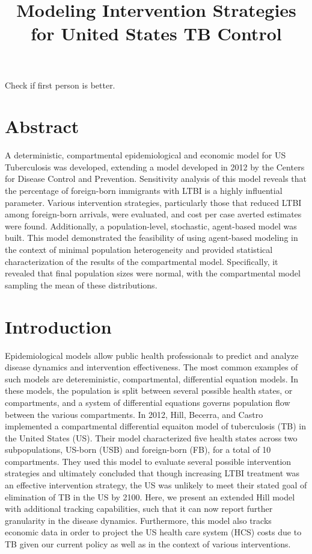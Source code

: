 \documentclass{amsart}
\title{Modeling Intervention Strategies for United States TB Control}
\begin{document}
\maketitle

{\huge \color{red} Check if first person is better.}

\section{Abstract}
A deterministic, compartmental epidemiological and economic model for US
Tuberculosis was developed, extending a model developed in 2012 by the Centers
for Disease Control and Prevention. Sensitivity analysis of this model reveals
that the percentage of foreign-born immigrants with LTBI is a highly influential
parameter. Various intervention strategies, particularly those that reduced LTBI
among foreign-born arrivals, were evaluated, and cost per case averted estimates
were found.  Additionally, a population-level, stochastic, agent-based model was
built. This model demonstrated the feasibility of using agent-based modeling in
the context of minimal population heterogeneity and provided statistical
characterization of the results of the compartmental model. Specifically, it
revealed that final population sizes were normal, with the compartmental model
sampling the mean of these distributions. 

\section{Introduction}
Epidemiological models allow public health professionals to predict and analyze
disease dynamics and intervention effectiveness. The most common examples of
such models are detereministic, compartmental, differential equation models. In
these models, the population is split between several possible health states, or
compartments, and a system of differential equations governs population flow
between the various compartments. In 2012, Hill, Becerra, and Castro implemented
a compartmental differential equaiton model of tuberculosis (TB) in the United
States (US).  Their model characterized five health states across two
subpopulations, US-born (USB) and foreign-born (FB), for a total of 10
compartments. They used this model to evaluate several possible intervention
strategies and ultimately concluded that though increasing LTBI treatment was an
effective intervention strategy, the US was unlikely to meet their stated goal
of elimination of TB in the US by 2100. Here, we present an extended Hill model
with additional tracking capabilities, such that it can now report
further granularity in the disease dynamics. Furthermore, this model also tracks
economic data in order to project the US health care system (HCS) costs due to
TB given our current policy as well as in the context of various interventions. 
\end{document}
